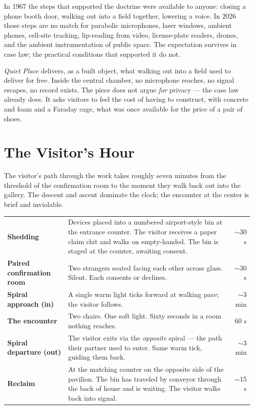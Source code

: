 \documentclass[10pt, letterpaper]{article}
\begin{document}
In 1967 the steps that supported the doctrine were available to anyone: closing a phone booth door, walking out into a field together, lowering a voice. In 2026 those steps are no match for parabolic microphones, laser windows, ambient phones, cell-site tracking, lip-reading from video, license-plate readers, drones, and the ambient instrumentation of public space. The expectation survives in case law; the practical conditions that supported it do not.

\textit{Quiet Place} delivers, as a built object, what walking out into a field used to deliver for free. Inside the central chamber, no microphone reaches, no signal escapes, no record exists. The piece does not argue \textit{for} privacy --- the case law already does. It asks visitors to feel the cost of having to construct, with concrete and foam and a Faraday cage, what was once available for the price of a pair of shoes.

\section{The Visitor's Hour}

The visitor's path through the work takes roughly seven minutes from the threshold of the confirmation room to the moment they walk back out into the gallery. The descent and ascent dominate the clock; the encounter at the center is brief and inviolable.

\begin{metricbox}
\begin{tabularx}{\textwidth}{@{} >{\bfseries}l X r @{}}
Shedding & Devices placed into a numbered airport-style bin at the entrance counter. The visitor receives a paper claim chit and walks on empty-handed. The bin is staged at the counter, awaiting consent. & $\sim$30 s \\
Paired confirmation room & Two strangers seated facing each other across glass. Silent. Each consents or declines. & $\sim$30 s \\
Spiral approach (in) & A single warm light ticks forward at walking pace; the visitor follows. & $\sim$3 min \\
The encounter & Two chairs. One soft light. Sixty seconds in a room nothing reaches. & 60 s \\
Spiral departure (out) & The visitor exits via the \emph{opposite} spiral --- the path their partner used to enter. Same warm tick, guiding them back. & $\sim$3 min \\
Reclaim & At the matching counter on the opposite side of the pavilion. The bin has traveled by conveyor through the back of house and is waiting. The visitor walks back into signal. & $\sim$15 s \\
\end{tabularx}
\end{metricbox}
\end{document}

